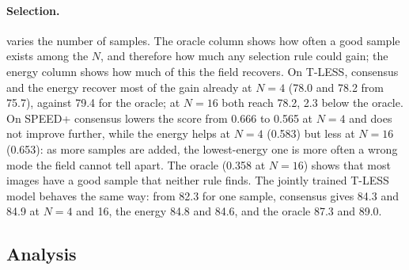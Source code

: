 \paragraph{Selection.}
 varies the number of samples. The oracle column shows how often a good sample exists among the $N$, and therefore how
much any selection rule could gain; the energy column shows how much of this the field recovers. On T-LESS, consensus and the energy
recover most of the gain already at $N=4$ (78.0 and 78.2 from 75.7), against 79.4 for the oracle; at $N=16$ both reach 78.2, 2.3 below
the oracle. On SPEED+ consensus lowers the score from 0.666 to 0.565 at $N=4$ and does not improve further, while the energy helps at
$N=4$ (0.583) but less at $N=16$ (0.653): as more samples are added, the lowest-energy one is more often a wrong mode the field cannot
tell apart. The oracle (0.358 at $N=16$) shows that most images have a good sample that neither rule finds.
The jointly trained T-LESS model behaves the same way: from 82.3 for one sample, consensus gives 84.3 and 84.9 at $N=4$ and 16, the energy
84.8 and 84.6, and the oracle 87.3 and 89.0.

\subsection{Analysis}
\label{sec:analysis}

